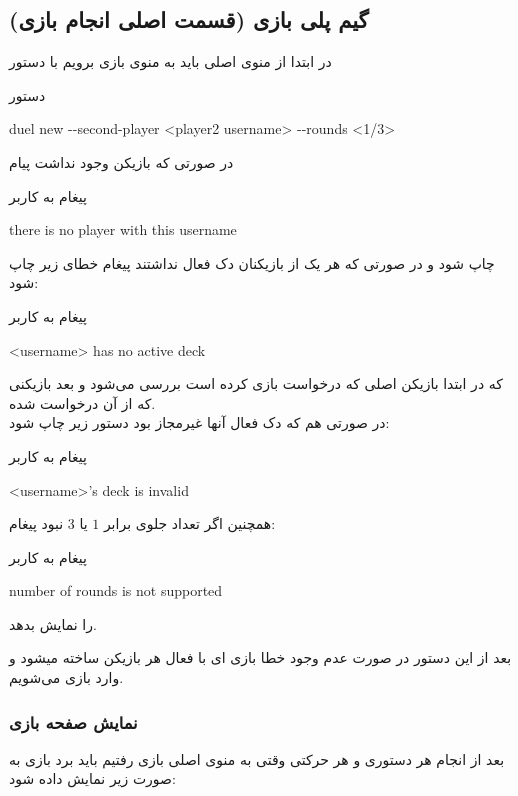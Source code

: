 \documentclass[]{article}
\begin{document}
\subsection*{{\titr گیم پلی بازی (قسمت اصلی انجام بازی)}}
در ابتدا از منوی اصلی باید به منوی بازی برویم با دستور
\begin{mybox}[colback=yellow]{دستور}
	\begin{latin}	
		duel new -{}-second-player <player2 username> -{}-rounds <1/3>
	\end{latin}
\end{mybox}
    در صورتی که بازیکن  وجود نداشت پیام
\begin{mybox}[colback=yellow]{پیغام به کاربر}
	\begin{latin}	
		there is no player with this username
	\end{latin}
\end{mybox}
    چاپ شود و در صورتی که هر یک از بازیکنان دک فعال نداشتند پیغام خطای زیر 
    چاپ شود:
\begin{mybox}[colback=yellow]{پیغام به کاربر}
	\begin{latin}	
		<username> has no active deck
	\end{latin}
\end{mybox}
    که در ابتدا بازیکن اصلی که درخواست بازی کرده است بررسی می‌شود و بعد 
    بازیکنی که از آن درخواست شده.
\\
    در صورتی هم که دک فعال آنها غیرمجاز بود دستور زیر چاپ شود:
\begin{mybox}[colback=yellow]{پیغام به کاربر}
	\begin{latin}	
		<username>’s deck is invalid
	\end{latin}
\end{mybox}
همچنین اگر تعداد جلوی 
برابر $1$ یا $3$ نبود پیغام:

\begin{mybox}[colback=yellow]{پیغام به کاربر}
	\begin{latin}	
		number of rounds is not supported
	\end{latin}
\end{mybox}
را نمایش بدهد.

    بعد از این دستور در صورت عدم وجود خطا بازی ای با  فعال هر 
    بازیکن ساخته میشود و وارد بازی می‌شویم.
\subsubsection*{{\titr نمایش صفحه بازی}}
بعد از انجام هر دستوری و هر حرکتی وقتی به منوی اصلی بازی رفتیم باید برد 
بازی به صورت زیر نمایش داده شود:
\end{document}
